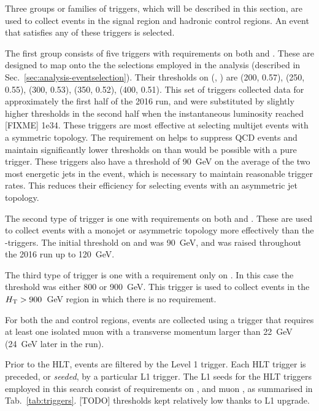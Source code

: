 Three groups or families of triggers, which will be described in this section, 
are used to collect events in the signal region and hadronic control regions. 
An event that satisfies any of these triggers is selected.

The first group consists of five triggers with requirements on both \scalht and 
\alphat. These are designed to map onto the the selections employed in the 
analysis (described in Sec.~\ref{sec:analysis-eventselection}). Their 
thresholds on (\scalht, \alphat) are (200, 0.57), (250, 0.55), (300, 0.53), 
(350, 0.52), (400, 0.51). This set of triggers collected data for approximately 
the first half of the 2016 run, and were substituted by slightly higher \alphat 
thresholds in the second half when the instantaneous luminosity reached [FIXME] 
1e34.
These triggers are most effective at selecting multijet events with a symmetric 
topology. The requirement on \alphat helps to suppress QCD events and maintain 
significantly lower thresholds on \scalht than would be possible with a pure 
\scalht trigger.
These triggers also have a threshold of 90~GeV on the average \pt of the two 
most energetic jets in the event, which is necessary to maintain reasonable 
trigger rates. This reduces their efficiency for selecting events with an 
asymmetric jet topology.

The second type of trigger is one with requirements on both \met and \mht. 
These are used to collect events with a monojet or asymmetric topology more 
effectively than the \scalht-\alphat triggers. The initial threshold on \met 
and \mht was 90~GeV, and was raised throughout the 2016 run up to 120~GeV.

The third type of trigger is one with a requirement only on \scalht. In this 
case the threshold was either 800 or 900~GeV. This trigger is used to collect 
events in the $\mbox{$H_\text{T}$}>900$~GeV region in which there is no \alphat requirement.

For both the \mj and \mmj control regions, events are collected using a trigger 
that requires at least one isolated muon with a transverse momentum larger than 
22~GeV (24~GeV later in the run).

Prior to the HLT, events are filtered by the Level 1 trigger. Each HLT trigger 
is preceded, or \textit{seeded}, by a particular L1 trigger. The L1 seeds for 
the HLT triggers employed in this search consist of requirements on \scalht, 
\met and muon \pt, as summarised in Tab.~\ref{tab:triggers}. [TODO] thresholds 
kept relatively low thanks to L1 upgrade.

